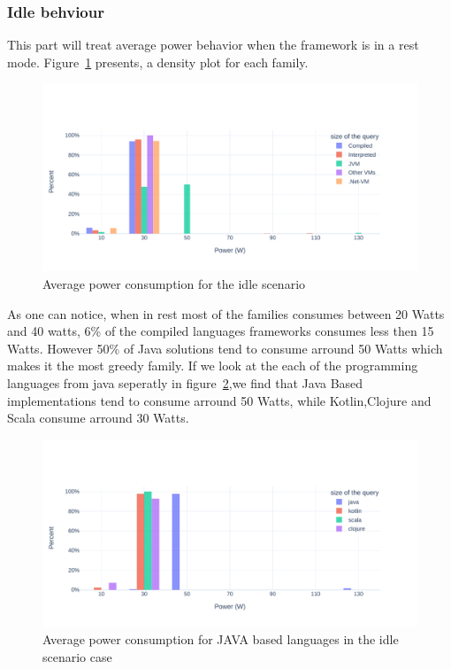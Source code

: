 \subsubsection{Idle behviour}
This part will treat average power behavior when the framework is in a rest mode. Figure~\ref{fig:av_power_idle} presents, a density plot for each family.

\begin{figure}[bht]
    \centering
    \includegraphics[width=1.0\columnwidth]{imgs/av_power_idle}
    \caption{Average power consumption for the idle scenario}
    \label{fig:av_power_idle}
\end{figure}
As one can notice, when in rest most of the families consumes between 20 Watts and 40 watts, 6\% of the compiled languages frameworks consumes less then 15 Watts. However 50\% of Java solutions tend to consume arround 50 Watts which makes it the most greedy family.
If we look at the each of the programming languages from java seperatly in figure~\ref{fig:av_power_java_idle},we find that Java Based implementations tend to consume arround 50 Watts, while Kotlin,Clojure and Scala consume arround 30 Watts.

\begin{figure}[bht]
    \centering
    \includegraphics[width=1.0\columnwidth]{imgs/av_power_java_idle}
    \caption{Average power consumption for  JAVA based languages in the idle scenario case}
    \label{fig:av_power_java_idle}
\end{figure}

